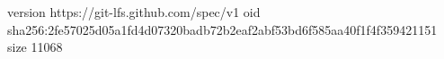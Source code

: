version https://git-lfs.github.com/spec/v1
oid sha256:2fe57025d05a1fd4d07320badb72b2eaf2abf53bd6f585aa40f1f4f359421151
size 11068
